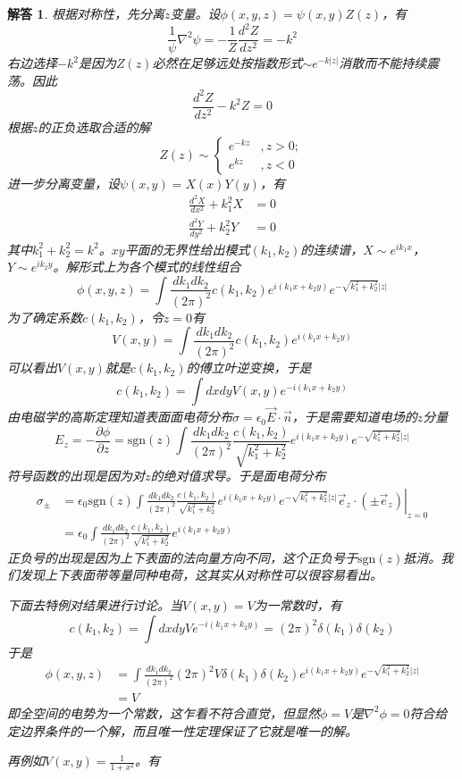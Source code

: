 \documentclass[a4paper,11pt]{ctexart}
\newtheorem{ans}{解答}[section]
\newcommand{\beq}{\begin{equation}}
\newcommand{\eeq}{\end{equation}}
\newcommand{\bea}{\begin{equation}\begin{aligned}}
\newcommand{\eea}{\end{aligned}\end{equation}}
\newcommand{\epv}{\epsilon_0}
\newcommand{\pfrac}[2]{\frac{\partial #1}{\partial #2}}
\newcommand{\sgn}{\mathrm{sgn}}
\begin{document}
\begin{ans}
根据对称性，先分离$z$变量。设$\phi(x,y,z) = \psi(x,y) Z(z)$，有
\beq
\frac{1}{\psi} \nabla^2 \psi  = - \frac{1}{Z} \frac{d^2 Z}{dz^2} =- k^2
\eeq
右边选择$-k^2$是因为$Z(z)$必然在足够远处按指数形式$\sim e^{-k|z|}$消散而不能持续震荡。因此
\beq
\frac{d^2 Z}{dz^2} - k^2 Z = 0
\eeq
根据$z$的正负选取合适的解
\beq
Z(z) \sim \begin{cases} e^{-kz} &,z>0; \\ e^{kz} &,z<0 \end{cases}
\eeq
进一步分离变量，设$\psi(x,y) = X(x)Y(y)$，有
\bea
\frac{d^2 X}{dx^2} + k_1^2 X &= 0 \\
\frac{d^2 Y}{dy^2} + k_2^2 Y &= 0
\eea
其中$k_1^2 + k_2^2 = k^2$。$xy$平面的无界性给出模式$(k_1,k_2)$的连续谱，$X\sim e^{ik_1 x}$，$Y \sim e^{ik_2 y}$。解形式上为各个模式的线性组合
\beq
\phi(x,y,z) = \int \frac{dk_1 dk_2}{(2\pi)^2} c(k_1,k_2) e^{i(k_1 x + k_2 y)} e^{-\sqrt{k_1^2 + k_2^2} |z|}
\eeq
为了确定系数$c(k_1,k_2)$，令$z=0$有
\beq
V(x,y) = \int \frac{dk_1 dk_2}{(2\pi)^2} c(k_1,k_2) e^{i(k_1 x + k_2 y)}
\eeq
可以看出$V(x,y)$就是$c(k_1,k_2)$的傅立叶逆变换，于是
\beq
c(k_1,k_2) = \int dx dy V(x,y) e^{-i(k_1 x + k_2 y)}
\eeq
由电磁学的高斯定理知道表面面电荷分布$\sigma = \epv \vec{E} \cdot \vec{n}$，于是需要知道电场的$z$分量
\beq
E_z = - \pfrac{\phi}{z} =\sgn(z) \int \frac{dk_1 dk_2}{(2\pi)^2}\frac{c(k_1,k_2)}{\sqrt{k_1^2 + k_2^2}} e^{i(k_1 x + k_2 y)} e^{-\sqrt{k_1^2 + k_2^2} |z|}
\eeq
符号函数的出现是因为对$z$的绝对值求导。于是面电荷分布
\bea
\sigma_\pm &= \left. \epv\sgn(z) \int \frac{dk_1 dk_2}{(2\pi)^2}\frac{c(k_1,k_2)}{\sqrt{k_1^2 + k_2^2}} e^{i(k_1 x + k_2 y)} e^{-\sqrt{k_1^2 + k_2^2} |z|} \vec{e}_z \cdot (\pm \vec{e}_z) \right|_{z=0} \\ &= \epv \int \frac{dk_1 dk_2}{(2\pi)^2}\frac{c(k_1,k_2)}{\sqrt{k_1^2 + k_2^2}} e^{i(k_1 x + k_2 y)}
\eea
正负号的出现是因为上下表面的法向量方向不同，这个正负号于$\sgn(z)$抵消。我们发现上下表面带等量同种电荷，这其实从对称性可以很容易看出。\par
下面去特例对结果进行讨论。当$V(x,y) = V$为一常数时，有
\beq
c(k_1,k_2) = \int dx dy V e^{-i(k_1 x + k_2 y)} = (2\pi)^2 \delta(k_1) \delta(k_2)
\eeq
于是
\bea
\phi(x,y,z) &= \int \frac{dk_1 dk_2}{(2\pi)^2} (2\pi)^2 V \delta(k_1) \delta(k_2) e^{i(k_1 x + k_2 y)} e^{-\sqrt{k_1^2 + k_2^2} |z|} \\ 
&= V
\eea
即全空间的电势为一个常数，这乍看不符合直觉，但显然$\phi = V$是$\nabla^2 \phi = 0$符合给定边界条件的一个解，而且唯一性定理保证了它就是唯一的解。\par
再例如$V(x,y) = \frac{1}{1+x^2}$。有

\end{ans}
\end{document}
